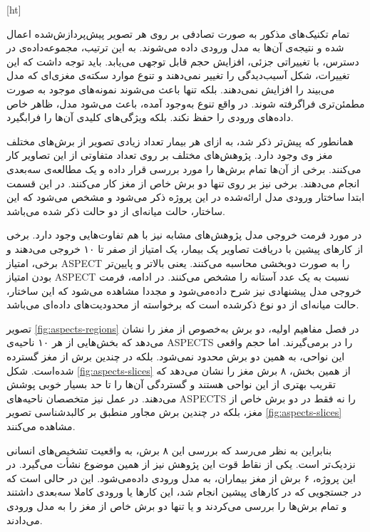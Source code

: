 [ht]

تمام تکنیک‌های مذکور به صورت تصادفی بر روی هر تصویر پیش‌پردازش‌شده اعمال شده و نتیجه‌ی آن‌ها
به مدل ورودی داده می‌شوند.
به این ترتیب، مجموعه‌داده‌ی در دسترس، با تغییراتی جزئی، افزایش حجم قابل توجهی می‌یابد.
باید توجه داشت که این تغییرات، شکل آسیب‌دیدگی را تغییر نمی‌دهند و تنوع موارد سکته‌ی مغزی‌ای که مدل می‌بیند را 
افزایش نمی‌دهند.
بلکه تنها باعث می‌شوند نمونه‌های موجود به صورت مطمئن‌تری فراگرفته شوند.
در واقع تنوع به‌وجود آمده، باعث می‌شود مدل، ظاهر خاص داده‌های ورودی را حفظ نکند. بلکه ویژگی‌های کلیدی آن‌ها را فرابگیرد.


همانطور که پیش‌تر ذکر شد، به ازای هر بیمار تعداد زیادی تصویر از برش‌های مختلف مغز وی وجود دارد.
پژوهش‌ها‌ی مختلف بر روی تعداد متفاوتی از این تصاویر کار می‌کنند.
برخی از آن‌ها تمام برش‌ها را مورد بررسی قرار داده و یک مطالعه‌ی سه‌بعدی انجام می‌دهند.
برخی نیز بر روی تنها دو برش خاص از مغز کار می‌کنند.
در این قسمت ابتدا ساختار ورودی مدل ارائه‌شده در این پروژه ذکر می‌شود
و مشخص می‌شود که
این ساختار، حالت میانه‌ای از دو حالت ذکر شده می‌باشد.

در مورد فرمت خروجی مدل پژوهش‌های مشابه نیز با هم تفاوت‌هایی وجود دارد.
برخی از کارهای پیشین با دریافت تصاویر یک بیمار، یک امتیاز از صفر تا ۱۰ خروجی می‌دهند و برخی، امتیاز ASPECT را به صورت دوبخشی محاسبه می‌کنند.
یعنی بالاتر و پایین‌تر بودن امتیاز ASPECT نسبت به یک عدد آستانه را مشخص می‌کنند.
در ادامه، فرمت خروجی مدل پیشنهادی نیز شرح داده‌می‌شود و
مجددا مشاهده می‌شود که این ساختار، حالت میانه‌ای از دو نوع ذکرشده است که برخواسته از محدودیت‌های داده‌ای می‌باشد.


تصویر \ref{fig:aspects-regions}
در فصل مفاهیم اولیه، دو برش به‌خصوص از مغز را نشان می‌دهد که بخش‌هایی از هر ۱۰ ناحیه‌ی ASPECTS را در برمی‌گیرند.
اما حجم واقعی این نواحی، به همین دو برش محدود نمی‌شود.
بلکه در چندین برش از مغز گسترده شده‌است.
شکل \ref{fig:aspects-slices}
از همین بخش، ۸ برش مغز را نشان می‌دهد که تقریب بهتری از این نواحی هستند و گستردگی آن‌ها را تا حد بسیار خوبی پوشش می‌دهند.
در عمل نیز متخصصان
ناحیه‌های ASPECTS را 
 نه فقط در دو برش خاص از مغز، بلکه 
 در چندین برش مجاور منطبق بر کالبدشناسی تصویر 
 \ref{fig:aspects-slices}
 مشاهده می‌کنند.

 بنابراین به نظر می‌رسد که بررسی این ۸ برش، به واقعیت تشخیص‌های انسانی نزدیک‌تر است.
 یکی از نقاط قوت این پژوهش نیز از همین موضوع نشأت می‌گیرد.
 در این پروژه، ۶ برش از مغز بیماران، به مدل ورودی داده‌می‌شود.
این در حالی است که در جستجویی که در کارهای پیشین
انجام شد، این کارها یا ورودی کاملا سه‌بعدی داشتند و تمام برش‌ها را بررسی می‌کردند و یا تنها دو برش خاص از مغز را به مدل ورودی می‌دادند.

